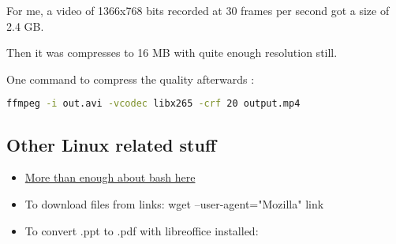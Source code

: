 For me, a video of 1366x768 bits recorded at 30 frames per second got a size of 2.4 GB.

Then it was compresses to 16 MB with quite enough resolution still.

One command to compress the quality afterwards :
\begin{lstlisting}[language=bash]
    ffmpeg -i out.avi -vcodec libx265 -crf 20 output.mp4
\end{lstlisting}


\subsection{Other Linux related stuff}
\begin{itemize}
    \item \href{http://tldp.org/HOWTO/Bash-Prog-Intro-HOWTO.html}{More than enough about bash here} 
    \item To download files from links: wget --user-agent="Mozilla" link
    \item To convert .ppt to .pdf with libreoffice installed:
\end{itemize}

